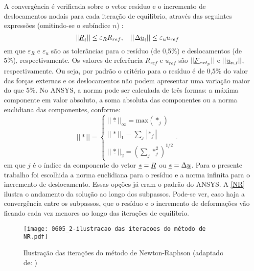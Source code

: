 A convergência é verificada sobre o vetor resíduo e o incremento de deslocamentos nodais para cada iteração de equilíbrio, através das seguintes expressões (omitindo-se o subíndice $n$) \cite[p. 667]{ANSYS2018}:
\begin{equation}
	\label{eq:convergencia}
	||\underline{R}_i|| \leq \varepsilon_R R_{ref},~~~ ||\Delta \underline u_i || \leq \varepsilon_u u_{ref}
\end{equation}
em que $\varepsilon_R$ e $\varepsilon_u$ são as tolerâncias para o resíduo (de 0,5\%) e deslocamentos (de 5\%), respectivamente. Os valores de referência $R_{ref}$ e $u_{ref}$ são $||\underline{F}_{ext_p}||$ e $||\underline u_{n,i}||$, respectivamente. Ou seja, por padrão o critério para o resíduo é de 0,5\% do valor das forças externas e os deslocamentos não podem apresentar uma variação maior do que 5\%. No ANSYS, a norma pode ser calculada de três formas: a máxima componente em valor absoluto, a soma absoluta das componentes ou a norma euclidiana das componentes, conforme:
\begin{equation}
	\label{eq:jacobiano_transformacao}
	||\underline *|| = \left\{
	\begin{array}{lcl}
		||\underline *||_\infty = \text{max}(*_j) \\
		||\underline *||_1 = \sum_{j}|*_j| \\
		||\underline *||_2 = (\sum_{j}*_j^2)^{1/2}
	\end{array}
	\right..
\end{equation}
em que $j$ é o índice da componente do vetor $\underline * = \underline{R}$ ou $\underline * = \Delta \underline u$. Para o presente trabalho foi escolhida a norma euclidiana para o resíduo e a norma infinita para o incremento de deslocamento. Essas opções já eram o padrão do ANSYS. A \autoref{NR} ilustra o andamento da solução ao longo dos subpassos. Pode-se ver, caso haja a convergência entre os subpassos, que o resíduo e o incremento de deformações vão ficando cada vez menores ao longo das iterações de equilíbrio.
\begin{figure}[H]
	\begin{center}
		\texttt{[image: 0605\_2-ilustracao das iteracoes do método de NR.pdf]}
	\end{center}
	\caption{\label{NR}Ilustração das iterações do método de Newton-Raphson (adaptado de: )}
\end{figure}

